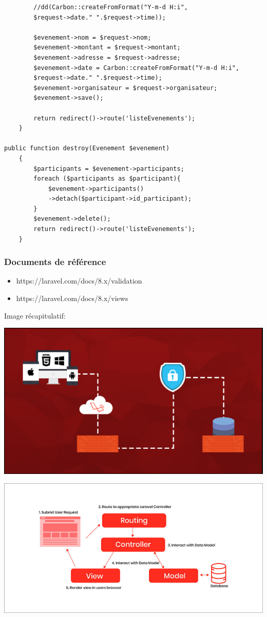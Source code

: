 \documentclass[12pt,a4paper]{article}
\begin{document}
\begin{verbatim}
        //dd(Carbon::createFromFormat("Y-m-d H:i", 
        $request->date." ".$request->time));

        $evenement->nom = $request->nom;
        $evenement->montant = $request->montant;
        $evenement->adresse = $request->adresse;
        $evenement->date = Carbon::createFromFormat("Y-m-d H:i", 
        $request->date." ".$request->time);
        $evenement->organisateur = $request->organisateur;
        $evenement->save();

        return redirect()->route('listeEvenements');
    }
    
public function destroy(Evenement $evenement)
    {
        $participants = $evenement->participants;
        foreach ($participants as $participant){
            $evenement->participants()
            ->detach($participant->id_participant);
        }
        $evenement->delete();
        return redirect()->route('listeEvenements');
    }
\end{verbatim}

\subsubsection{Documents de référence}
\begin{itemize}
\item https://laravel.com/docs/8.x/validation
\item https://laravel.com/docs/8.x/views
\end{itemize}

Image récapitulatif:
\begin{center}
\includegraphics[scale=0.5]{img/laravel.png}
\end{center}
\begin{center}
\includegraphics[scale=0.5]{img/MVC-Support.jpg}
\end{center}
\end{document}

